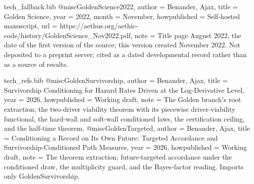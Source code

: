 \begin{filecontents}[overwrite]{tech_fallback.bib}
@misc{GoldenScience2022,
  author       = {Benander, Ajax},
  title        = {Golden Science},
  year         = {2022},
  month        = {November},
  howpublished = {Self-hosted manuscript},
  url          = {https://aethus.org/aethic-code/history/GoldenScience_Nov2022.pdf},
  note         = {Title page August 2022, the date of the first version of the source; this version created November 2022. Not deposited to a
                  preprint server; cited as a dated developmental record rather than
                  as a source of results.}
}
\end{filecontents}
\begin{filecontents}[overwrite]{tech_refs.bib}
@misc{GoldenSurvivorship,
  author       = {Benander, Ajax},
  title        = {Survivorship Conditioning for Hazard Rates Driven at the Log-Derivative Level},
  year         = {2026},
  howpublished = {Working draft},
  note         = {The Golden branch's root extraction; the two-driver viability
                  theorem with its piecewise driver-viability functional, the
                  hard-wall and soft-wall conditioned laws, the certification
                  ceiling, and the half-time theorem.}
}
@misc{GoldenTargeted,
  author       = {Benander, Ajax},
  title        = {Conditioning a Record on Its Own Future: Targeted Accordance and Survivorship-Conditioned Path Measures},
  year         = {2026},
  howpublished = {Working draft},
  note         = {The theorem extraction; future-targeted accordance under the
                  conditioned draw, the multiplicity guard, and the Bayes-factor
                  reading. Imports only GoldenSurvivorship.}
}


\end{filecontents}
